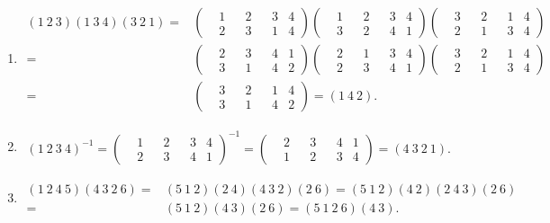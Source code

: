 \documentclass[reqno,a4paper,12pt]{amsart}
\begin{document}
\begin{enumerate}[1.]
\begin{enumerate}[(1)]
\item 
\begin{align*}
	(1 \ 2 \ 3)(1 \ 3 \ 4)(3 \ 2 \ 1) =& \left( \begin{aligned}
		&1 & &2 & &3 & 4 \\
		&2 & &3 & &1 & 4
	\end{aligned}\right)\left( \begin{aligned}
		&1 & &2 & &3 & 4 \\
		&3 & &2 & &4 & 1
	\end{aligned}\right)\left( \begin{aligned}
		&3 & &2 & &1 & 4 \\
		&2 & &1 & &3 & 4
	\end{aligned}\right) \\
	=& \left( \begin{aligned}
		&2 & &3 & &4 & 1 \\
		&3 & &1 & &4 & 2
	\end{aligned}\right)\left( \begin{aligned}
		&2 & &1 & &3 & 4 \\
		&2 & &3 & &4 & 1
	\end{aligned}\right)\left( \begin{aligned}
		&3 & &2 & &1 & 4 \\
		&2 & &1 & &3 & 4
	\end{aligned}\right) \\
	=& \left( \begin{aligned}
		&3 & &2 & &1 & 4 \\
		&3 & &1 & &4 & 2
	\end{aligned}\right) = (1 \ 4 \ 2).
\end{align*}

\item 
\begin{align*}
	(1 \ 2 \ 3 \ 4)^{-1} = \left( \begin{aligned}
		&1 & &2 & &3 & 4 \\
		&2 & &3 & &4 & 1
	\end{aligned}\right)^{-1} = \left( \begin{aligned}
		&2 & &3 & &4 & 1 \\
		&1 & &2 & &3 & 4
	\end{aligned}\right) = (4 \ 3 \ 2 \ 1).
\end{align*}

\item 
\begin{align*}
	(1 \ 2 \ 4 \ 5)(4 \ 3 \ 2 \ 6) =& (5 \ 1 \ 2)(2 \ 4)(4 \ 3 \ 2)(2 \ 6) = (5 \ 1 \ 2)(4 \ 2)(2 \ 4 \ 3)(2 \ 6) \\
	=&(5 \ 1 \ 2)(4 \ 3)(2 \ 6) = (5 \ 1 \ 2 \ 6)(4 \ 3).
\end{align*}


\end{enumerate}
\end{enumerate}
\end{document}
